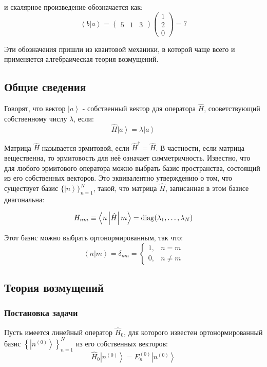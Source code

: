 \documentclass[a4paper,12pt]{article}
\begin{document}
\noindent
и скалярное произведение обозначается как:
\[
\left\langle b|a\right\rangle =\begin{pmatrix}5 & 1 & 3\end{pmatrix}\begin{pmatrix}1\\
2\\
0
\end{pmatrix}=7
\]


\noindent
Эти обозначения пришли из квантовой механики, в которой чаще всего
и применяется алгебраическая теория возмущений. 


\subsection*{Общие сведения}

Говорят, что вектор $\left|a\right\rangle $ - собственный вектор
для оператора $\hat{H}$, сооветствующий собственному числу $\lambda$,
если: 
\[
\hat{H}\left|a\right\rangle =\lambda\left|a\right\rangle 
\]


\noindent
Матрица $\hat{H}$ называется эрмитовой, если $\hat{H}^{\dagger}=\hat{H}$.
В частности, если матрица вещественна, то эрмитовость для неё означает
симметричность. Известно, что для любого эрмитового оператора можно
выбрать базис пространства, состоящий из его собственных векторов.
Это эквивалентно утверждению о том, что существует базис $\{\left|n\right\rangle \}_{n=1}^{N}$,
такой, что матрица $\hat{H}$, записанная в этом базисе диагональна:

\[
H_{nm}\equiv\left\langle n\left|\hat{H}\right|m\right\rangle ={\rm diag}(\lambda_{1},\dots,\lambda_{N})
\]


\noindent
Этот базис можно выбрать ортонормированным, так что:
\[
\left\langle n|m\right\rangle =\delta_{nm}=\begin{cases}
1, & n=m\\
0, & n\neq m
\end{cases}
\]

\subsection*{Теория возмущений}


\subsubsection*{Постановка задачи}

Пусть имеется линейный оператор $\hat{H}_{0}$, для которого известен
ортонормированный базис $\left\{ \left|n^{(0)}\right\rangle \right\} _{n=1}^{N}$
из его собственных векторов:
\[
\hat{H}_{0}\left|n^{(0)}\right\rangle =E_{n}^{(0)}\left|n^{(0)}\right\rangle 
\]
\end{document}

